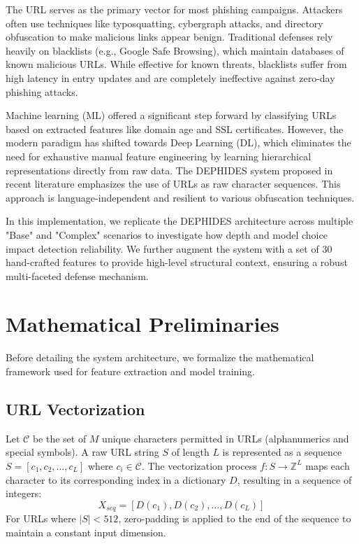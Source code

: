 \documentclass[journal,twocolumn]{IEEEtran}
\begin{document}
The URL serves as the primary vector for most phishing campaigns. Attackers often use techniques like typosquatting, cybergraph attacks, and directory obfuscation to make malicious links appear benign. Traditional defenses rely heavily on blacklists (e.g., Google Safe Browsing), which maintain databases of known malicious URLs. While effective for known threats, blacklists suffer from high latency in entry updates and are completely ineffective against zero-day phishing attacks.

Machine learning (ML) offered a significant step forward by classifying URLs based on extracted features like domain age and SSL certificates. However, the modern paradigm has shifted towards Deep Learning (DL), which eliminates the need for exhaustive manual feature engineering by learning hierarchical representations directly from raw data. The DEPHIDES system proposed in recent literature emphasizes the use of URLs as raw character sequences. This approach is language-independent and resilient to various obfuscation techniques.

In this implementation, we replicate the DEPHIDES architecture across multiple "Base" and "Complex" scenarios to investigate how depth and model choice impact detection reliability. We further augment the system with a set of 30 hand-crafted features to provide high-level structural context, ensuring a robust multi-faceted defense mechanism.

\section{Mathematical Preliminaries}
Before detailing the system architecture, we formalize the mathematical framework used for feature extraction and model training.

\subsection{URL Vectorization}
Let $\mathcal{C}$ be the set of $M$ unique characters permitted in URLs (alphanumerics and special symbols). A raw URL string $S$ of length $L$ is represented as a sequence $S = [c_1, c_2, \dots, c_L]$ where $c_i \in \mathcal{C}$. The vectorization process $f: S \to \mathbb{Z}^L$ maps each character to its corresponding index in a dictionary $D$, resulting in a sequence of integers:
\begin{equation}
    X_{seq} = [D(c_1), D(c_2), \dots, D(c_L)]
\end{equation}
For URLs where $|S| < 512$, zero-padding is applied to the end of the sequence to maintain a constant input dimension.
\end{document}

